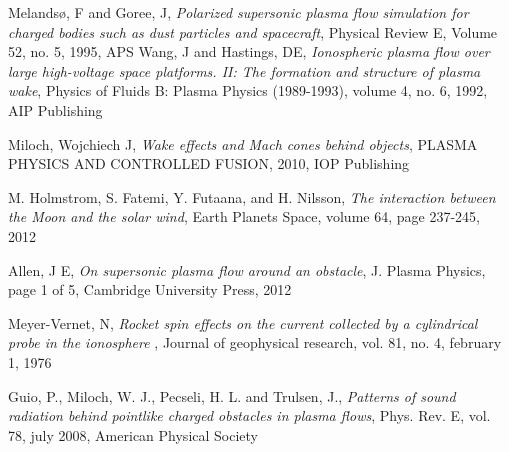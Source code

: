 \documentclass[twoside]{article}
\begin{document}
\begin{multicols}{2}
\begin{thebibliography}{99}
  Melands{\o}, F and Goree, J,
  \emph{Polarized supersonic plasma flow simulation for charged bodies such as dust particles and spacecraft},
  Physical Review E,
  Volume 52,
  no. 5,
  1995,
  APS
  Wang, J and Hastings, DE,
  \emph{Ionospheric plasma flow over large high-voltage space platforms. II: The formation and structure of plasma wake},
  Physics of Fluids B: Plasma Physics (1989-1993),
  volume 4,
  no. 6,
  1992,
  AIP Publishing

  Miloch, Wojchiech J,
  \emph{Wake effects and Mach cones behind objects},
  PLASMA PHYSICS AND CONTROLLED FUSION,
  2010,
  IOP Publishing

  M. Holmstrom, S. Fatemi, Y. Futaana, and H. Nilsson,
  \emph{The interaction between the Moon and the solar wind},
  Earth Planets Space,
  volume 64,
  page 237-245,
  2012

  Allen, J E,
  \emph{On supersonic plasma flow around an obstacle},
  J. Plasma Physics,
  page 1 of 5,
  Cambridge University Press,
  2012

  Meyer-Vernet, N,
  \emph{Rocket spin effects on the current collected by a cylindrical probe in the ionosphere },
  Journal of geophysical research,
  vol. 81,
  no. 4,
  february 1,
  1976

  Guio, P., Miloch, W. J., Pecseli, H. L. and Trulsen, J.,
  \emph{Patterns of sound radiation behind pointlike charged obstacles in plasma flows},
  Phys. Rev. E,
  vol. 78,
  july 2008,
  American Physical Society

\end{thebibliography}

\end{multicols}
\end{document}
